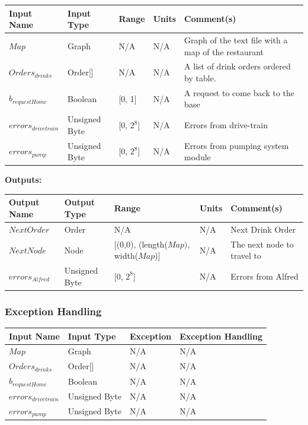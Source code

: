 \documentclass [10pt]{article}
\begin{document}
\begin{longtable}{|l|l|l|l|l|}\hline 
	\rowcolor{tableCell}\textbf{Input Name} & \textbf{Input Type} & \textbf{Range} & \textbf{Units} & \textbf{Comment(s)} \\ \hline
	$ Map $ & Graph & N/A & N/A & Graph of the text file with a map of the restaurant \\ \hline
	\rowcolor{tableCell}$ Orders_{drinks} $ & Order[] & N/A & N/A & A list of drink orders ordered by table. \\ \hline
	$ b_{requestHome} $ & Boolean & [0, 1]& N/A &  A request to come back to the base\\ \hline
	\rowcolor{tableCell}$ errors_{drivetrain} $ & Unsigned Byte & [0, $2^{8}$]& N/A & Errors from drive-train \\ \hline
	$  errors_{pump} $ & Unsigned Byte & [0, $2^{8}$]& N/A & Errors from pumping system module \\ \hline
\end{longtable}


\textbf{Outputs: } \\

\begin{longtable}{|l|l|l|l|l|}\hline 
	\rowcolor{tableCell}\textbf{Output Name} & \textbf{Output Type} & \textbf{Range} & \textbf{Units} & \textbf{Comment(s)} \\ \hline
	$ NextOrder $ & Order & N/A & N/A & Next Drink Order \\ \hline
	\rowcolor{tableCell}$ NextNode $ & Node & [(0,0), (length($Map)$, width($Map$)] & N/A & The next node to travel to \\ \hline
	$  errors_{Alfred} $ & Unsigned Byte & [0, $2^{8}$]& N/A & Errors from Alfred \\ \hline
\end{longtable}


\subsubsection{Exception Handling}

\begin{longtable}{|l|l|l|l|}\hline 
	\rowcolor{tableCell}\textbf{Input Name} & \textbf{Input Type} & \textbf{Exception} & \textbf{Exception Handling} \\ \hline
	$ Map $ & Graph & N/A & N/A  \\ \hline
	\rowcolor{tableCell}$ Orders_{drinks} $ & Order[] & N/A & N/A \\ \hline
	$ b_{requestHome} $ & Boolean & N/A &  N/A \\ \hline
	\rowcolor{tableCell}$ errors_{drivetrain} $ & Unsigned Byte & N/A & N/A \\ \hline
	$  errors_{pump} $ & Unsigned Byte & N/A & N/A \\ \hline
\end{longtable}
\end{document}
